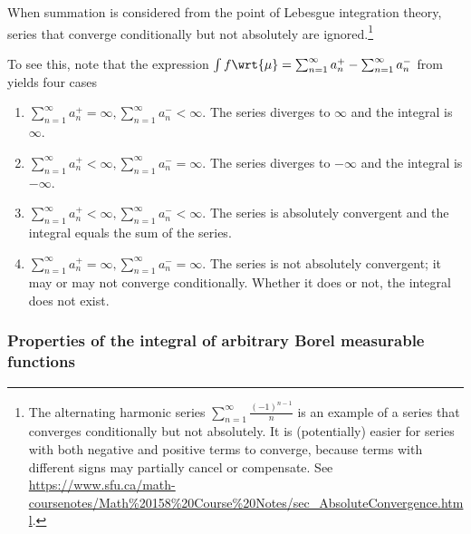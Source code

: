 \documentclass{article} %
\newcommand{\dmu}{\wrt{\mu}}
\begin{document}
\begin{remark}{}
When summation is considered from the point of Lebesgue integration theory, series that converge conditionally but not absolutely are ignored.\footnote{The alternating harmonic series $\sum_{n=1}^\infty \frac{(-1)^{n-1}}{n}$ is an example of a series that converges conditionally but not absolutely. It is (potentially) easier for series with both negative and positive terms to converge, because terms with different signs may partially cancel or compensate.  See \url{https://www.sfu.ca/math-coursenotes/Math\%20158\%20Course\%20Notes/sec\_AbsoluteConvergence.html}.} 

To see this, note that the expression $\int f \dmu = \sum_{n=1}^\infty a_n^+ - \sum_{n=1}^\infty a_n^-$ from  yields four cases

\begin{enumerate}
\item 	$\sum_{n=1}^\infty a_n^+ = \infty,  \sum_{n=1}^\infty a_n^- < \infty$.  The series diverges to $\infty$ and the integral is $\infty$.
\item  $\sum_{n=1}^\infty a_n^+ < \infty,  \sum_{n=1}^\infty a_n^- = \infty$. The series diverges to $-\infty$ and the integral is $-\infty$.
\item $\sum_{n=1}^\infty a_n^+ < \infty,  \sum_{n=1}^\infty a_n^- < \infty$. The series is absolutely convergent and the integral equals the sum of the series.
\item  $\sum_{n=1}^\infty a_n^+ = \infty,  \sum_{n=1}^\infty a_n^- = \infty$. The series is not absolutely convergent; it may or may not converge conditionally.  Whether it does or not, the integral does not exist.
\end{enumerate}
\end{remark}


\subsubsection{Properties of the integral of arbitrary Borel measurable functions} \label{sec:properties_of_integral_of_arbitrary_Borel_measurable_functions}
\end{document}
